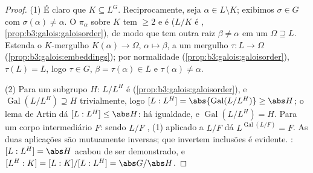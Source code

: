 \begin{proof}
(1) É claro que $K \subseteq L^G$. Reciprocamente, seja $\alpha \in L
\setminus K$; exibimos $\sigma \in G$ com
$\sigma(\alpha) \ne
\alpha$. O  $\pi_\alpha$ sobre $K$ tem  $\geq 2$ e
é  ($L/K$ é , \cref{prop:b3:galois:galoisorder}), de modo que tem
outra raiz $\beta \neq \alpha$ em um  $\Omega \supseteq L$. Estenda o $K$-mergulho
$K(\alpha) \to \Omega$, $\alpha \mapsto
\beta$, a um mergulho $\tau\colon L \to \Omega$ (\cref{prop:b3:galois:embeddings}); por normalidade
(\cref{prop:b3:galois:galoisorder}), $\tau(L) = L$, logo $\tau \in
G$, $\beta = \tau(\alpha) \in L$ e $\tau(\alpha) \neq
\alpha$.

(2) Para um subgrupo $H$: $L/L^H$ é 
(\cref{prop:b3:galois:galoisorder}), e $\operatorname{Gal}(L/L^H) \supseteq H$ trivialmente, logo $[L:L^H] =
\abs{\operatorname{Gal}(L/L^H)} \geq \abs H$; o lema de Artin dá
$[L:L^H] \leq \abs H$: há igualdade, e $\operatorname{Gal}(L/L^H) = H$. Para um corpo intermediário $F$:
sendo $L/F$ , (1) aplicado a $L/F$ dá $L^{\operatorname{Gal}(L/F)} = F$. As duas
aplicações são mutuamente inversas; que invertem inclusões é evidente.
: $[L:L^H] = \abs H$ acabou de ser demonstrado, e $[L^H:K] = [L:K]/[L:L^H] = \abs G/\abs H$.


\end{proof}
